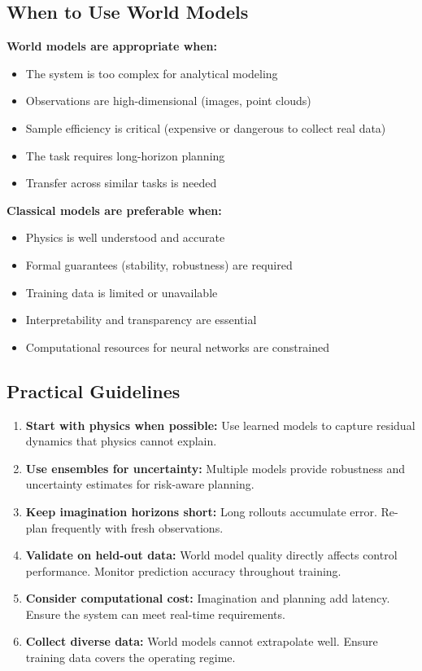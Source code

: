 \subsection{When to Use World Models}

\textbf{World models are appropriate when:}
\begin{itemize}
    \item The system is too complex for analytical modeling
    \item Observations are high-dimensional (images, point clouds)
    \item Sample efficiency is critical (expensive or dangerous to collect real data)
    \item The task requires long-horizon planning
    \item Transfer across similar tasks is needed
\end{itemize}

\textbf{Classical models are preferable when:}
\begin{itemize}
    \item Physics is well understood and accurate
    \item Formal guarantees (stability, robustness) are required
    \item Training data is limited or unavailable
    \item Interpretability and transparency are essential
    \item Computational resources for neural networks are constrained
\end{itemize}

\subsection{Practical Guidelines}

\begin{enumerate}
    \item \textbf{Start with physics when possible:} Use learned models to capture residual dynamics that physics cannot explain.

    \item \textbf{Use ensembles for uncertainty:} Multiple models provide robustness and uncertainty estimates for risk-aware planning.

    \item \textbf{Keep imagination horizons short:} Long rollouts accumulate error. Re-plan frequently with fresh observations.

    \item \textbf{Validate on held-out data:} World model quality directly affects control performance. Monitor prediction accuracy throughout training.

    \item \textbf{Consider computational cost:} Imagination and planning add latency. Ensure the system can meet real-time requirements.

    \item \textbf{Collect diverse data:} World models cannot extrapolate well. Ensure training data covers the operating regime.
\end{enumerate}

